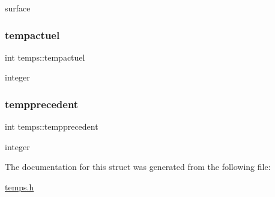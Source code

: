 surface \mbox{\label{structtemps_ab07c63dc7591472ca0214e52ff4cb014}} 
\subsubsection{\texorpdfstring{tempactuel}{tempactuel}}
{\footnotesize\ttfamily int temps\+::tempactuel}

integer \mbox{\label{structtemps_a94454b9ce545c311e78f31f7add21952}} 
\subsubsection{\texorpdfstring{tempprecedent}{tempprecedent}}
{\footnotesize\ttfamily int temps\+::tempprecedent}

integer 

The documentation for this struct was generated from the following file\+:\begin{DoxyCompactItemize}
\item 
\hyperlink{temps_8h}{temps.\+h}\end{DoxyCompactItemize}
